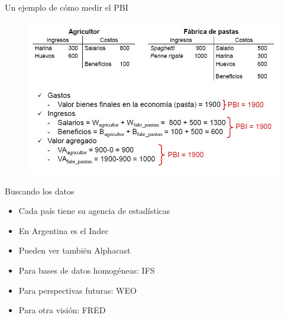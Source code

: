 \documentclass{beamer}
\begin{document}
\begin{frame}{Un ejemplo de cómo medir el PBI}
    \begin{figure} [H]   \includegraphics[scale=0.55]{Figures/C16.2.jpg}
\label{fig:25.2}
\end{figure}

\end{frame}

\begin{frame}{Buscando los datos}
    \begin{itemize}
        \item Cada país tiene su agencia de estadísticas \vspace{1mm}
        \item En Argentina es el Indec \vspace{1mm}
        \item Pueden ver también Alphacast \vspace{1mm}
        \item Para bases de datos homogéneas: IFS \vspace{1mm}
        \item Para perspectivas futuras: WEO \vspace{1mm}
        \item Para otra visión: FRED
        
    \end{itemize}
\end{frame}
\end{document}
